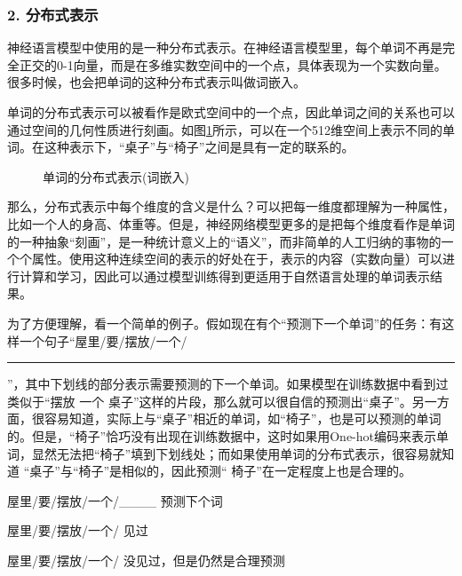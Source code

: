 \subsubsection{2. 分布式表示}

\parinterval  神经语言模型中使用的是一种分布式表示。在神经语言模型里，每个单词不再是完全正交的0-1向量，而是在多维实数空间中的一个点，具体表现为一个实数向量。很多时候，也会把单词的这种分布式表示叫做词嵌入。

\parinterval  单词的分布式表示可以被看作是欧式空间中的一个点，因此单词之间的关系也可以通过空间的几何性质进行刻画。如图\ref{fig:9-65}所示，可以在一个512维空间上表示不同的单词。在这种表示下，“桌子”与“椅子”之间是具有一定的联系的。

\begin{figure}[htp]
\centering

\caption{单词的分布式表示(词嵌入) }
\label{fig:9-65}
\end{figure}

\parinterval  那么，分布式表示中每个维度的含义是什么？可以把每一维度都理解为一种属性，比如一个人的身高、体重等。但是，神经网络模型更多的是把每个维度看作是单词的一种抽象“刻画”，是一种统计意义上的“语义”，而非简单的人工归纳的事物的一个个属性。使用这种连续空间的表示的好处在于，表示的内容（实数向量）可以进行计算和学习，因此可以通过模型训练得到更适用于自然语言处理的单词表示结果。

\parinterval  为了方便理解，看一个简单的例子。假如现在有个“预测下一个单词”的任务：有这样一个句子“屋里/要/摆放/一个/\rule[-3pt]{1cm}{0.05em}”，其中下划线的部分表示需要预测的下一个单词。如果模型在训练数据中看到过类似于“摆放 一个 桌子”这样的片段，那么就可以很自信的预测出“桌子”。另一方面，很容易知道，实际上与“桌子”相近的单词，如“椅子”，也是可以预测的单词的。但是，“椅子”恰巧没有出现在训练数据中，这时如果用One-hot编码来表示单词，显然无法把“椅子”填到下划线处；而如果使用单词的分布式表示，很容易就知道 “桌子”与“椅子”是相似的，因此预测“ 椅子”在一定程度上也是合理的。
\begin{example}
屋里/要/摆放/一个/\_\_\_\_ \hspace{0.5em} \quad \quad 预测下个词

\hspace{2em} 屋里/要/摆放/一个/{} \hspace{3.2em}见过

\hspace{2em} 屋里/要/摆放/一个/{} \hspace{3.2em}没见过，但是仍然是合理预测
\end{example}

